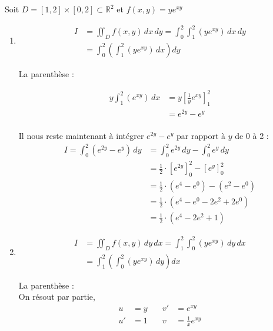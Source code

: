\begin{solution}
    Soit $D=[1,2]\times [0,2]\subset \mathbb{R}^2$ et $f(x,y) = ye^{xy}$
    \begin{enumerate}[label=(\alph*)]
        \item 

        \[
        \begin{aligned}
        I &= \iint_D f(x, y) \, dx \, dy = \int_0^2 \int_1^2 (ye^{xy}) \, dx \, dy \\
        &= \int_0^2 \left( \int_1^2 (ye^{xy}) \, dx \right) dy
        \end{aligned}
        \]

        La parenthèse : 

        \[
        \begin{aligned}
            y \int_1^2 (e^{xy}) \, dx &= y \left[ \frac{1}{y} e^{xy} \right]_1^2 \\
            &= e^{2y} - e^{y} \\
        \end{aligned}
        \]

        Il nous reste maintenant à intégrer \( e^{2y} - e^{y} \) par rapport à \( y \) de 0 à 2 :
        \[
        \begin{aligned}
            I = \int_0^2 (e^{2y} - e^{y}) \, dy &= \int_0^2 e^{2y} \, dy - \int_0^2 e^{y} \, dy \\
            &= \frac{1}{2} \cdot \left[ e^{2y} \right]_0^2 - \left[ e^{y} \right]_0^2 \\
            &= \frac{1}{2} \cdot (e^{4} - e^{0}) - (e^{2} - e^{0}) \\
            &= \frac{1}{2} \cdot (e^{4} - e^{0} - 2e^{2} + 2e^{0}) \\
            &= \frac{1}{2} \cdot (e^{4} - 2e^{2} + 1)
        \end{aligned}
        \]

        \item
        \[
        \begin{aligned}
        I &= \iint_D f(x, y) \, dy \, dx = \int_1^2 \int_0^2 (ye^{xy}) \, dy \, dx \\
        &= \int_1^2 \left( \int_0^2 (ye^{xy}) \, dy \right) dx
        \end{aligned}
        \]

        La parenthèse : \\
        On résout par partie,
        \[
        \begin{aligned}
            u   &= y          & \quad v' &= e^{xy} \\
            u'  &= 1          & \quad v  &= \frac{1}{x} e^{xy}
        \end{aligned}
        \]


\end{enumerate}
\end{solution}
